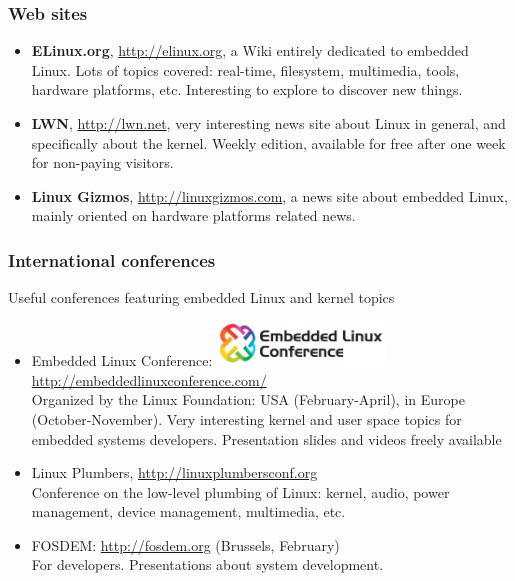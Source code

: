 \begin{frame}
  \frametitle{Web sites}
  \begin{itemize}
  \item {\bf ELinux.org}, \url{http://elinux.org}, a Wiki entirely
    dedicated to embedded Linux. Lots of topics covered: real-time,
    filesystem, multimedia, tools, hardware platforms,
    etc. Interesting to explore to discover new things.
  \item {\bf LWN}, \url{http://lwn.net}, very interesting news site
    about Linux in general, and specifically about the kernel. Weekly
    edition, available for free after one week for non-paying
    visitors.
  \item {\bf Linux Gizmos}, \url{http://linuxgizmos.com}, a news site
    about embedded Linux, mainly oriented on hardware platforms
    related news.
  \end{itemize}
\end{frame}

\begin{frame}
  \frametitle{International conferences}
  Useful conferences featuring embedded Linux and kernel topics
  \begin{itemize}
  \item
    Embedded Linux Conference:
    \includegraphics[width=0.35\textwidth]{slides/sysdev-references/elc-logo.png}\\
    \url{http://embeddedlinuxconference.com/}\\
    Organized by the Linux Foundation: USA (February-April), in Europe
    (October-November). Very interesting kernel and user space topics for embedded
    systems developers. Presentation slides and videos freely available
  \item Linux Plumbers, \url{http://linuxplumbersconf.org}\\
    Conference on the low-level plumbing of Linux: kernel, audio,
    power management, device management, multimedia, etc.
  \item FOSDEM: \url{http://fosdem.org} (Brussels, February)\\
    For developers. Presentations about system development.
  \end{itemize}
\end{frame}
